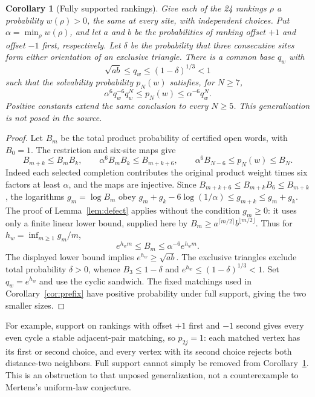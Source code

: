 \documentclass[11pt]{article}
\newtheorem{corollary}[theorem]{Corollary}
\begin{document}
\begin{corollary}[Fully supported rankings]\label{cor:weighted}
Give each of the 24 rankings $\rho$ a probability $w(\rho)>0$, the same
at every site, with independent choices. Put
$\alpha=\min_\rho w(\rho)$, and let $a$ and $b$ be the probabilities
of ranking offset $+1$ and offset $-1$ first, respectively.
Let $\delta$ be the probability that three consecutive sites form either
orientation of an exclusive triangle. There is a common base $q_w$ with
\[
 \sqrt{ab}\leq q_w\leq(1-\delta)^{1/3}<1
\]
such that the solvability probability $p_N(w)$ satisfies, for $N\geq7$,
\[
 \alpha^6 q_w^{-6}q_w^N\leq p_N(w)\leq\alpha^{-6}q_w^N.
\]
Positive constants extend the same conclusion to every $N\geq5$.
This generalization is not posed in the source.
\end{corollary}
\begin{proof}
Let $B_m$ be the total product probability of certified open words,
with $B_0=1$. The restriction and six-site maps give
\[
 B_{m+k}\leq B_mB_k,\qquad
 \alpha^6B_mB_k\leq B_{m+k+6},\qquad
 \alpha^6B_{N-6}\leq p_N(w)\leq B_N.
\]
Indeed each selected completion contributes the original product weight
times six factors at least $\alpha$, and the maps are injective.
Since $B_{m+k+6}\leq B_{m+k}B_6\leq B_{m+k}$, the logarithms
$g_m=\log B_m$ obey
$g_m+g_k-6\log(1/\alpha)\leq g_{m+k}\leq g_m+g_k$.
The proof of Lemma~\ref{lem:defect} applies without the condition
$g_m\geq0$: it uses only a finite linear lower bound, supplied here by
$B_m\geq a^{\lceil m/2\rceil}b^{\lfloor m/2\rfloor}$.
Thus for $h_w=\inf_{m\geq1}g_m/m$,
\[
 e^{h_wm}\leq B_m\leq\alpha^{-6}e^{h_wm}.
\]
The displayed lower bound implies $e^{h_w}\geq\sqrt{ab}$.
The exclusive triangles exclude total probability $\delta>0$, whence
$B_3\leq1-\delta$ and $e^{h_w}\leq(1-\delta)^{1/3}<1$.
Set $q_w=e^{h_w}$ and use the cyclic sandwich.
The fixed matchings used in Corollary~\ref{cor:prefix} have positive
probability under full support, giving the two smaller sizes.
\end{proof}

For example, support on rankings with offset $+1$ first and $-1$ second
gives every even cycle a stable adjacent-pair matching, so $p_{2j}=1$:
each matched vertex has its first or second choice, and every vertex
with its second choice rejects both distance-two neighbors.
Full support cannot simply be removed from Corollary~\ref{cor:weighted}.
This is an obstruction to that unposed generalization, not a
counterexample to Mertens's uniform-law conjecture.
\end{document}
